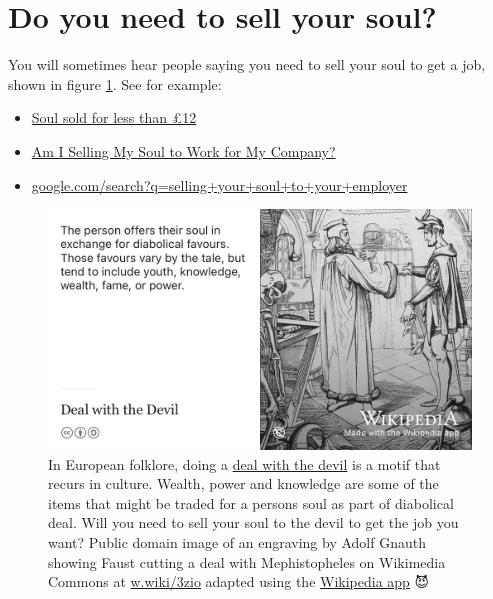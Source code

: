 \documentclass[
]{book}
\providecommand{\tightlist}{%
  \setlength{\itemsep}{0pt}\setlength{\parskip}{0pt}}
\begin{document}
\hypertarget{soul}{%
\section{Do you need to sell your soul?}\label{soul}}

You will sometimes hear people saying you need to sell your soul to get a job, shown in figure \ref{fig:diabolical-fig}. See for example:

\begin{itemize}
\tightlist
\item
  \href{http://news.bbc.co.uk/1/hi/england/2051061.stm}{Soul sold for less than £12} \citep{bbcsoul}
\item
  \href{https://www.thevectorimpact.com/selling-your-soul/}{Am I Selling My Soul to Work for My Company?} \citep{sellmysoul}
\item
  \href{https://www.google.com/search?q=selling+your+soul+to+your+employer}{google.com/search?q=selling+your+soul+to+your+employer}
\end{itemize}

\begin{figure}

{\centering \includegraphics[width=1\linewidth]{images/deal-with-the-devil} 

}

\caption{In European folklore, doing a \href{https://en.wikipedia.org/wiki/Deal_with_the_Devil}{deal with the devil} is a motif that recurs in culture. Wealth, power and knowledge are some of the items that might be traded for a persons soul as part of diabolical deal. Will you need to sell your soul to the devil to get the job you want? Public domain image of an engraving by Adolf Gnauth showing Faust cutting a deal with Mephistopheles on Wikimedia Commons at \href{https://w.wiki/3zio}{w.wiki/3zio} adapted using the \href{https://apps.apple.com/gb/app/wikipedia/id324715238}{Wikipedia app} 😈}\label{fig:diabolical-fig}
\end{figure}
\end{document}
